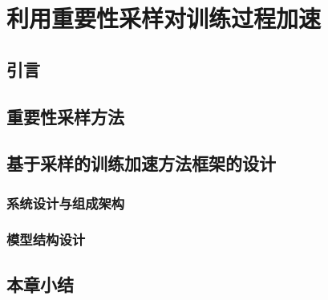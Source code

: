 
\chapter{利用重要性采样对训练过程加速}
\section{引言}
\section{重要性采样方法}
\section{基于采样的训练加速方法框架的设计}
\subsection{系统设计与组成架构}
\subsection{模型结构设计}
\section{本章小结}

